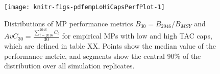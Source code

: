 \documentclass[]{article}
\begin{document}
\begin{figure}[htb]

{\centering \texttt{[image: knitr-figs-pdfempLoHiCapsPerfPlot-1]} 

}

\caption{Distributions of MP performance metrics $B_{30} = B_{2046}/B_{MSY}$ and $AvC_{30} = \frac{\sum_{t = 2016}^{2046} C_t }{30}$ for empirical MPs with low and high TAC caps, which are defined in table XX. Points show the median value of the performance metric, and segments show the central 90\% of the distribution over all simulation replicates.}\label{fig:empLoHiCapsPerfPlot}
\end{figure}

\newpage

\newpage
\singlespacing 
\end{document}
